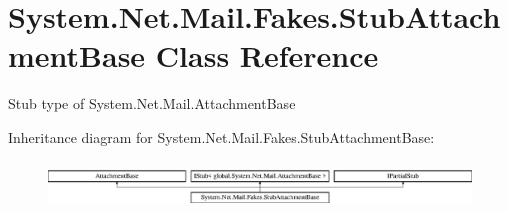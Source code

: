 \hypertarget{class_system_1_1_net_1_1_mail_1_1_fakes_1_1_stub_attachment_base}{\section{System.\-Net.\-Mail.\-Fakes.\-Stub\-Attachment\-Base Class Reference}
\label{class_system_1_1_net_1_1_mail_1_1_fakes_1_1_stub_attachment_base}
}


Stub type of System.\-Net.\-Mail.\-Attachment\-Base 


Inheritance diagram for System.\-Net.\-Mail.\-Fakes.\-Stub\-Attachment\-Base\-:\begin{figure}[H]
\begin{center}
\leavevmode
\includegraphics[height=1.265537cm]{class_system_1_1_net_1_1_mail_1_1_fakes_1_1_stub_attachment_base}
\end{center}
\end{figure}
